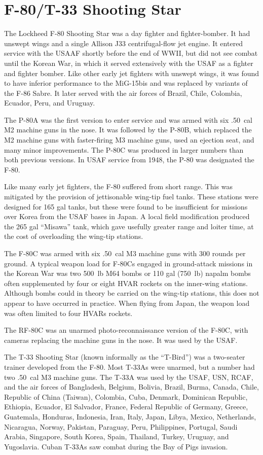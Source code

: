\section*{F-80/T-33 Shooting Star}

The Lockheed F-80 Shooting Star was a day fighter and fighter-bomber. It had unswept wings and a single Allison J33 centrifugal-flow jet engine. It entered service with the USAAF shortly before the end of WWII, but did not see combat until the Korean War, in which it served extensively with the USAF as a fighter and fighter bomber. Like other early jet fighters with unswept wings, it was found to have inferior performance to the MiG-15bis and was replaced by variants of the F-86 Sabre. It later served with the air forces of Brazil, Chile, Colombia, Ecuador, Peru, and Uruguay.

The P-80A was the first version to enter service and was armed with six .50~cal M2 machine guns in the nose. It was followed by the P-80B, which replaced the M2 machine guns with faster-firing M3 machine guns, used an ejection seat, and many minor improvements. The P-80C was produced in larger numbers than both previous versions. In USAF service from 1948, the P-80 was designated the F-80.

Like many early jet fighters, the F-80 suffered from short range. This was mitigated by the provision of jettisonable wing-tip fuel tanks. These stations were designed for 165 gal tanks, but these were found to be insufficient for missions over Korea from the USAF bases in Japan. A local field modification produced the 265 gal “Misawa” tank, which gave usefully greater range and loiter time, at the cost of overloading the wing-tip stations.

The F-80C was armed with six .50~cal M3 machine guns with 300 rounds per ground. A typical weapon load for F-80Cs engaged in ground-attack missions in the Korean War was two 500~lb M64 bombs or 110 gal (750~lb) napalm bombs often supplemented by four or eight HVAR rockets on the inner-wing stations. Although bombs could in theory be carried on the wing-tip stations, this does not appear to have occurred in practice. When flying from Japan, the weapon load was often limited to four HVARs rockets.

The RF-80C was an unarmed photo-reconnaissance version of the F-80C, with cameras replacing the machine guns in the nose. It was used by the USAF.

The T-33 Shooting Star (known informally as the “T-Bird”) was a two-seater trainer developed from the F-80. Most T-33As were unarmed, but a number had two .50~cal M3 machine guns. The T-33A was used by the USAF, USN, RCAF, and the air forces of Bangladesh, Belgium, Bolivia, Brazil, Burma, Canada, Chile, Republic of China (Taiwan), Colombia, Cuba, Denmark, Dominican Republic, Ethiopia, Ecuador, El Salvador, France, Federal Republic of Germany, Greece, Guatemala, Honduras, Indonesia, Iran, Italy, Japan, Libya, Mexico, Netherlands, Nicaragua, Norway, Pakistan, Paraguay, Peru, Philippines, Portugal, Saudi Arabia, Singapore, South Korea, Spain, Thailand, Turkey, Uruguay, and Yugoslavia. Cuban T-33As saw combat during the Bay of Pigs invasion.

